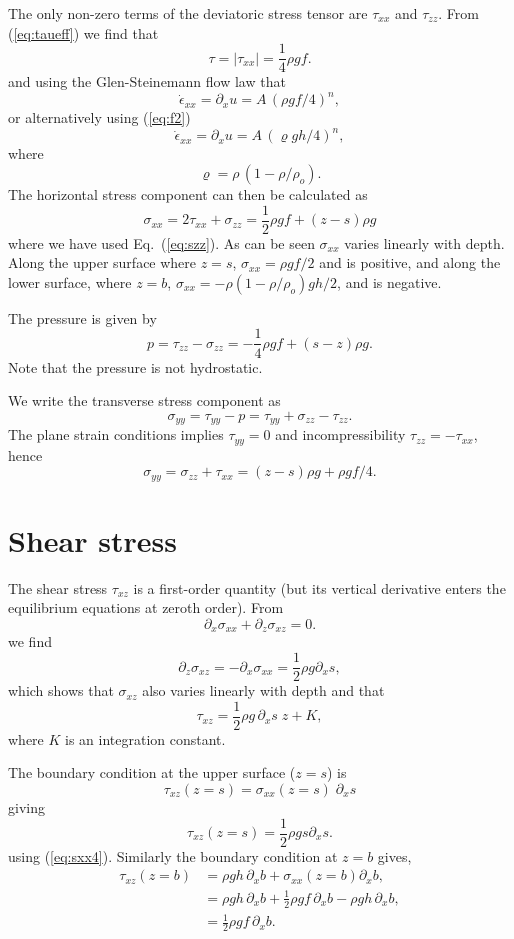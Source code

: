 \documentclass[10pt,a4paper]{book}
\newcommand{\p}{\partial}
\newcommand{\exx}{\dot{\epsilon}_{xx}}
\newcommand{\txx}{\tau_{xx}}
\newcommand{\tzz}{\tau_{zz}}
\newcommand{\txz}{\tau_{xz}}
\newcommand{\sxx}{\sigma_{xx}}
\newcommand{\sxz}{\sigma_{xz}}
\newcommand{\szz}{\sigma_{zz}}
\begin{document}
The only non-zero terms of the deviatoric stress tensor are $\txx$ and
$\tzz$. From (\ref{eq:taueff}) we find that
\[
\tau=|\txx|=\frac{1}{4} \rho g f .
\]
and using the Glen-Steinemann flow law that
\begin{equation}
\exx=\p_x u = A \, (\rho g f/4)^n ,
\label{eq:exx1HDf}
\end{equation}
or alternatively  using (\ref{eq:f2})
\begin{equation}
\exx=\p_x u = A \, (\varrho g h/4)^n ,
\label{eq:exx1HD}
\end{equation}
where
\[
\varrho=\rho \, (1-\rho/\rho_o) .
\]
The horizontal stress component can then be calculated as
\begin{equation}
\sxx=2 \tau_{xx}+\szz =\frac{1}{2} \rho g f +(z-s) \rho g
\label{eq:sxx4}
\end{equation}
where we have used Eq.~(\ref{eq:szz}). As can be seen $\sxx$ varies
linearly with depth. Along the upper surface where $z=s$,
$\sxx=\rho g f/2$ and is positive, and along the lower surface, where $z=b$,
$\sxx=-\rho (1-\rho/\rho_o) g h /2$, and is negative.


The pressure is given by
\[
p=\tzz-\szz=-\frac{1}{4} \rho g f + (s-z) \rho g.
\]
Note that the pressure is not hydrostatic.


We write the transverse stress component as
\[ \sigma_{yy}=\tau_{yy}-p=\tau_{yy}+\sigma_{zz}-\tau_{zz} . \]
The plane strain conditions implies $\tau_{yy}=0$ and incompressibility $\tau_{zz}=-\tau_{xx}$, hence
\[ \sigma_{yy}=\sigma_{zz}+\tau_{xx}=(z-s) \rho g + \rho g f/4 .\]


\section{Shear stress}
The shear stress $\txz$ is a first-order quantity (but its vertical
derivative enters the equilibrium equations at zeroth order). From
\[ \p_x \sxx + \p_z \sxz =0 .\]
we find
\begin{equation}
\p_z \sxz=-\p_x \sxx =\frac{1}{2} \rho g \p_x s ,
\end{equation}
which shows that $\sxz$ also varies linearly with depth and that
\begin{equation}
\txz=\frac{1}{2} \rho g \, \p_x s \; z +K,
\label{eq:txz1}
\end{equation}
where $K$ is an integration constant.


The boundary condition at the upper surface ($z=s$) is
\[
\txz(z=s)=\sxx(z=s) \; \p_x s
\]
giving 
\begin{equation}
\txz(z=s)=\frac{1}{2} \rho g s \p_x s.
\label{eq:txzs}
\end{equation}
using (\ref{eq:sxx4}).  Similarly the boundary condition at $z=b$
gives,
\begin{align}
\txz(z=b)&=\rho g h \, \p_x b+ \sxx(z=b) \p_x b ,\nonumber \\
&= \rho g h \, \p_x b + \frac{1}{2} \rho g f \, \p_x b- \rho g h \, \p_x b ,\nonumber \\
&= \frac{1}{2} \rho g f \, \p_x b.
\label{eq:txzb}
\end{align}
\end{document}
